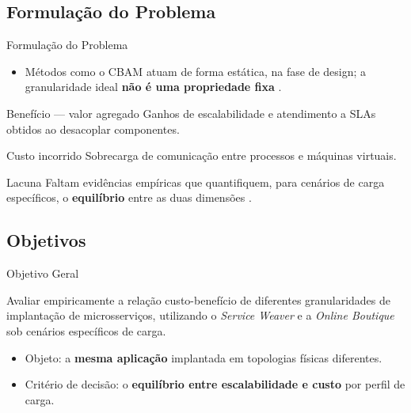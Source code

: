 \subsection{Formulação do Problema}
\label{subsec:formulacao}

\begin{frame}{Formulação do Problema}
    \begin{itemize}
        \item Métodos como o CBAM \cite{asundi2001cbam} atuam de forma estática, na fase de design; a granularidade ideal \textbf{não é uma propriedade fixa} \cite{hassan2020microservice, hassan2017ambients}.
    \end{itemize}
    \vfill
    \begin{exampleblock}{Benefício --- valor agregado}
        \small Ganhos de escalabilidade e atendimento a SLAs obtidos ao desacoplar componentes.
    \end{exampleblock}
    \begin{alertblock}{Custo incorrido}
        \small Sobrecarga de comunicação entre processos e máquinas virtuais.
    \end{alertblock}
    \begin{block}{Lacuna}
        \small Faltam evidências empíricas que quantifiquem, para cenários de carga específicos, o \textbf{equilíbrio} entre as duas dimensões \cite{hassan2020microservice}.
    \end{block}
\end{frame}

\subsection{Objetivos}
\label{subsec:objetivos}

\begin{frame}{Objetivo Geral}
    \vfill
    \begin{block}{}\centering
        Avaliar empiricamente a relação custo-benefício de diferentes granularidades de implantação de microsserviços, utilizando o \textit{Service Weaver} e a \textit{Online Boutique} sob cenários específicos de carga.
    \end{block}
    \vfill
    \begin{itemize}
        \item Objeto: a \textbf{mesma aplicação} implantada em topologias físicas diferentes.
        \item Critério de decisão: o \textbf{equilíbrio entre escalabilidade e custo} por perfil de carga.
    \end{itemize}
    \vfill
\end{frame}

